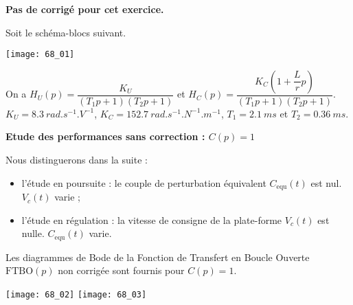 \normaltrue \difficilefalse \tdifficilefalse
\correctionfalse

\setcounter{numques}{0}


\ifcorrection
\else
\textbf{Pas de corrigé pour cet exercice.}
\fi

Soit le schéma-blocs suivant. 

\begin{center}
\texttt{[image: 68\_01]}
\end{center}

On a $H_U(p) = \dfrac{K_U}{\left( T_1 p +1 \right)\left( T_2 p +1 \right)}$ et $H_C(p) = \dfrac{K_C \left( 1+\dfrac{L}{r}p\right)}{\left( T_1 p +1 \right)\left( T_2 p +1 \right)}$. $K_U =\SI{8,3}{rad.s^{-1}.V^{-1}}$, $K_C = \SI{152,7}{rad.s^{-1}.N^{-1}.m^{-1}}$, $T_1 = \SI{2,1}{ms}$ et $T_2 = \SI{0,36}{ms}$.

\textbf{Etude des performances sans correction : $C( p) =1$}

Nous distinguerons dans la suite :
\begin{itemize}
\item l’étude en poursuite : le couple de perturbation équivalent $C_{\text{equ}} (t)$ est nul. $V_c(t)$ varie ;
\item l’étude en régulation : la vitesse de consigne de la plate-forme $V_c(t)$  est nulle. $C_{\text{equ}} (t)$ varie.
\end{itemize}

Les diagrammes de Bode de la Fonction de Transfert en Boucle Ouverte $\text{FTBO}( p)$ non corrigée sont fournis pour $C( p) = 1$.

\begin{center}
\texttt{[image: 68\_02]}
\texttt{[image: 68\_03]}
\end{center}

\ifprof
\else 
\fi

\ifprof
\else 
\fi

